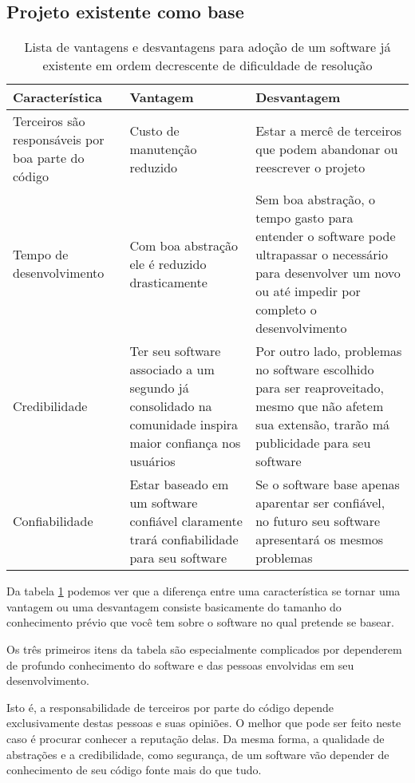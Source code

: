 \documentclass[12pt]{article}
\begin{document}
  \newpage
  \subsection{Projeto existente como base} \label{subsec:projeto-existente}
  \begin{table}[ht]
    \centering
    \caption{Lista de vantagens e desvantagens para adoção de um software já existente em ordem decrescente de dificuldade de resolução}
    \label{tab:projeto-existente}

    \begin{tabularx}{\textwidth}{| X | X | X |}
      \hline
      \textbf{Característica} & \textbf{Vantagem} & \textbf{Desvantagem} \\ \hline
      Terceiros são responsáveis por boa parte do código &
        Custo de manutenção reduzido &
        Estar a mercê de terceiros que podem abandonar ou reescrever o projeto \\ \hline
      Tempo de desenvolvimento &
        Com boa abstração ele é reduzido drasticamente &
        Sem boa abstração, o tempo gasto para entender o software pode ultrapassar o necessário para desenvolver um novo ou até impedir por completo o desenvolvimento \\ \hline
      Credibilidade &
        Ter seu software associado a um segundo já consolidado na comunidade inspira maior confiança nos usuários &
        Por outro lado, problemas no software escolhido para ser reaproveitado, mesmo que não afetem sua extensão, trarão má publicidade para seu software\\ \hline
      Confiabilidade &
        Estar baseado em um software confiável claramente trará confiabilidade para seu software &
        Se o software base apenas aparentar ser confiável, no futuro seu software apresentará os mesmos problemas\\ \hline
    \end{tabularx}
  \end{table}

  Da tabela \ref{tab:projeto-existente} podemos ver que a diferença entre uma característica se tornar uma vantagem ou uma desvantagem consiste basicamente do tamanho do conhecimento prévio que você tem sobre o software no qual pretende se basear.

  Os três primeiros itens da tabela são especialmente complicados por dependerem de profundo conhecimento do software e das pessoas envolvidas em seu desenvolvimento.

  Isto é, a responsabilidade de terceiros por parte do código depende exclusivamente destas pessoas e suas opiniões. O melhor que pode ser feito neste caso é procurar conhecer a reputação delas. Da mesma forma, a qualidade de abstrações e a credibilidade, como segurança, de um software vão depender de conhecimento de seu código fonte mais do que tudo.
\end{document}
